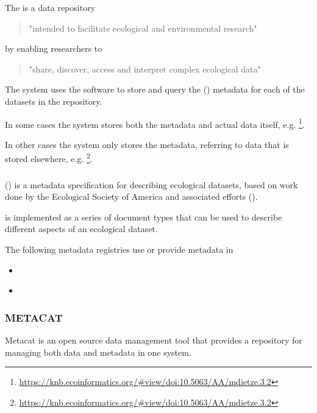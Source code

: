 \documentclass{article}
\begin{document}
The  {\cite{knb}} is a data repository
\begin{quote}
"intended to facilitate ecological and environmental research"
\end{quote}
by enabling researchers to
\begin{quote}
"share, discover, access and interpret complex ecological data"
\end{quote}

The \cite{knb} system uses the \cite{metacat} software to store and query
the  (\cite{eml}) metadata for each of the datasets in the repository.

In some cases the \cite{knb} system stores both the metadata and actual
data itself, e.g.
\footnote{\url{https://knb.ecoinformatics.org/#view/doi:10.5063/AA/mdietze.3.2}}.

In other cases the \cite{knb} system only stores the metadata,
referring to data that is stored elsewhere, e.g.
\footnote{\url{https://knb.ecoinformatics.org/#view/doi:10.5063/AA/mdietze.3.2}}.

\subsubsection{}

 (\cite{eml}) is a metadata specification
for describing ecological datasets, based on work done by the
Ecological Society of America
and associated efforts
 (\cite{michener-1997}).

\cite{eml} is implemented as a series of \cite{xml} document types that can be used to describe different aspects of an ecological dataset.

The following metadata registries use or provide metadata in \cite{eml}
\begin{itemize}
\item {} {\cite{knb}} 
\item {} {\cite{gbif}} 
\end{itemize}

\subsubsection{METACAT}


Metacat
is an open source data management tool that provides a repository for
managing both data and metadata in one system.
\end{document}

